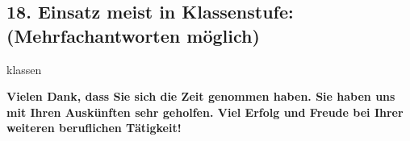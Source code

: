 \documentclass[a4paper,10pt]{article}
\begin{document}
{\subsection*{18. Einsatz meist in Klassenstufe: \\ (Mehrfachantworten möglich)}
\vspace{0.5cm}
\begin{questionmult}{klassen}
	\begin{choices}
	\end{choices}
\end{questionmult}



\bigskip

\begin{flushleft}
\textbf{Vielen Dank, dass Sie sich die Zeit genommen haben. Sie haben uns mit Ihren Auskünften sehr geholfen. Viel Erfolg und Freude bei Ihrer weiteren beruflichen Tätigkeit!}
\end{flushleft}


}
\end{document}
